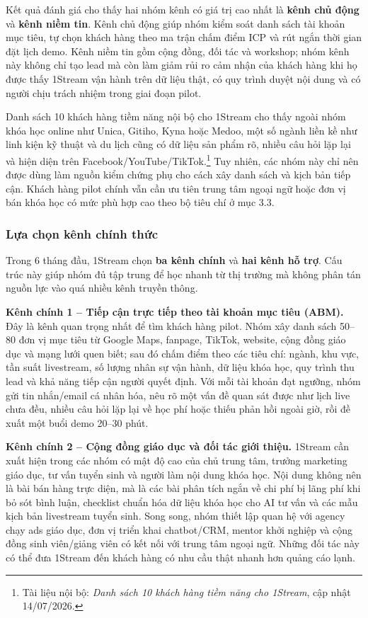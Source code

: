 Kết quả đánh giá cho thấy hai nhóm kênh có giá trị cao nhất là \textbf{kênh chủ
động} và \textbf{kênh niềm tin}. Kênh chủ động giúp nhóm kiểm soát danh sách tài
khoản mục tiêu, tự chọn khách hàng theo ma trận chấm điểm ICP và rút ngắn thời
gian đặt lịch demo. Kênh niềm tin gồm cộng đồng, đối tác và workshop; nhóm kênh
này không chỉ tạo lead mà còn làm giảm rủi ro cảm nhận của khách hàng khi họ
được thấy 1Stream vận hành trên dữ liệu thật, có quy trình duyệt nội dung và có
người chịu trách nhiệm trong giai đoạn pilot.

Danh sách 10 khách hàng tiềm năng nội bộ cho 1Stream cho thấy ngoài nhóm khóa học
online như Unica, Gitiho, Kyna hoặc Medoo, một số ngành liền kề như linh kiện kỹ
thuật và du lịch cũng có dữ liệu sản phẩm rõ, nhiều câu hỏi lặp lại và hiện diện
trên Facebook/YouTube/TikTok.\footnote{Tài liệu nội bộ: \textit{Danh sách 10
khách hàng tiềm năng cho 1Stream}, cập nhật 14/07/2026.} Tuy nhiên, các nhóm này chỉ nên được dùng làm nguồn kiểm chứng phụ cho cách xây danh
sách và kịch bản tiếp cận. Khách hàng pilot chính vẫn cần ưu tiên trung tâm ngoại
ngữ hoặc đơn vị bán khóa học có mức phù hợp cao theo bộ tiêu chí ở mục 3.3.

\subsubsection{Lựa chọn kênh chính thức}

Trong 6 tháng đầu, 1Stream chọn \textbf{ba kênh chính} và \textbf{hai kênh hỗ
trợ}. Cấu trúc này giúp nhóm đủ tập trung để học nhanh từ thị trường mà không
phân tán nguồn lực vào quá nhiều kênh truyền thông.

\textbf{Kênh chính 1 -- Tiếp cận trực tiếp theo tài khoản mục tiêu (ABM).}
Đây là kênh quan trọng nhất để tìm khách hàng pilot. Nhóm xây danh sách 50--80
đơn vị mục tiêu từ Google Maps, fanpage, TikTok, website, cộng đồng giáo dục và
mạng lưới quen biết; sau đó chấm điểm theo các tiêu chí: ngành, khu vực, tần suất
livestream, số lượng nhân sự vận hành, dữ liệu khóa học, quy trình thu lead và
khả năng tiếp cận người quyết định. Với mỗi tài khoản đạt ngưỡng, nhóm gửi tin
nhắn/email cá nhân hóa, nêu rõ một vấn đề quan sát được như lịch live chưa đều,
nhiều câu hỏi lặp lại về học phí hoặc thiếu phản hồi ngoài giờ, rồi đề xuất một
buổi demo 20--30 phút.

\textbf{Kênh chính 2 -- Cộng đồng giáo dục và đối tác giới thiệu.}
1Stream cần xuất hiện trong các nhóm có mật độ cao của chủ trung tâm, trưởng
marketing giáo dục, tư vấn tuyển sinh và người làm nội dung khóa học. Nội dung
không nên là bài bán hàng trực diện, mà là các bài phân tích ngắn về chi phí bị
lãng phí khi bỏ sót bình luận, checklist chuẩn hóa dữ liệu khóa học cho AI tư vấn
và các mẫu kịch bản livestream tuyển sinh. Song song, nhóm thiết lập quan hệ với
agency chạy ads giáo dục, đơn vị triển khai chatbot/CRM, mentor khởi nghiệp và
cộng đồng sinh viên/giảng viên có kết nối với trung tâm ngoại ngữ. Những đối tác
này có thể đưa 1Stream đến khách hàng có nhu cầu thật nhanh hơn quảng cáo lạnh.

